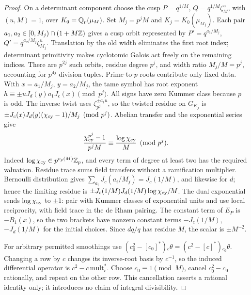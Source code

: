 \begin{proof}
On a determinant component choose the cusp
\(P=q^{1/M}\), \(Q=q^{1/M}\zeta_M^u\), with \((u,M)=1\),
over \(K_0=\mathbb Q_p(\mu_M)\).  Set \(M_j=p^jM\) and
\(K_j=K_0(\mu_{M_j})\).  Each pair
\(a_1,a_2\in[0,M_j)\cap(1+M\mathbb Z)\) gives a cusp orbit represented by
\(P'=q^{a_1/M_j}\), \(Q'=q^{a_2/M_j}\zeta_{M_j}^u\).
Translation by the old width eliminates the first root index; determinant
primitivity makes cyclotomic Galois act freely on the remaining indices.
There are \(p^{2j}\) such orbits, residue degree \(p^j\), and width
ratio \(M_j/M=p^j\), accounting for \(p^{4j}\) division tuples.
Prime-to-\(p\) roots contribute only fixed data.
With \(x=a_1/M_j\), \(y=a_2/M_j\), the tame symbol has root exponent
\(h\equiv\pm uJ_d(y)a_1J_c(x)\pmod{p^j}\).
All signs have zero Kummer class because \(p\) is odd.  The inverse
twist uses \(\zeta_{p^j}^{\pm a_1u}\), so the twisted residue on
\(G_{K_j}\) is
\(\pm J_c(x)J_d(y)(\chi_{\rm cy}-1)/M_j\pmod{p^j}\).
Abelian transfer and the exponential series give
\[
 \frac{\chi_{\rm cy}^{p^j}-1}{p^jM}
       \equiv\frac{\log\chi_{\rm cy}}M\pmod{p^j}.
\]
Indeed \(\log\chi_{\rm cy}\in p^{v_p(M)}\mathbb Z_p\), and every term
of degree at least two has the required valuation.  Residue trace
sums field transfers without a ramification multiplier.  Bernoulli
distribution gives \(\sum_{a_i}J_c(a_i/M_j)=J_c(1/M)\), and likewise
for \(d\); hence the limiting residue is
\(\pm J_c(1/M)J_d(1/M)\log\chi_{\rm cy}/M\).
The dual exponential sends \(\log\chi_{\rm cy}\) to \(\pm1\): pair
with Kummer classes of exponential units and use local reciprocity,
with field trace in the de Rham pairing.  The constant term of \(E_P\)
is \(-B_1(x)\), so the two brackets have nonzero constant terms
\(-J_c(1/M)\), \(-J_d(1/M)\) for the initial choices.  Since
\(dq/q\) has residue \(M\), the scalar is \(\pm M^{-2}\).

For arbitrary permitted smoothings use
\((c_0^2-[c_0]^*){}_c\theta=(c^2-[c]^*){}_{c_0}\theta\).
Changing a row by \(c\) changes its inverse-root basis by \(c^{-1}\),
so the induced differential operator is \(c^2-c\,\mathrm{mult}_c^*\).
Choose \(c_0\equiv1\pmod M\), cancel \(c_0^2-c_0\) rationally,
and repeat on the other row.  This cancellation asserts a rational
identity only; it introduces no claim of integral divisibility.
\end{proof}


